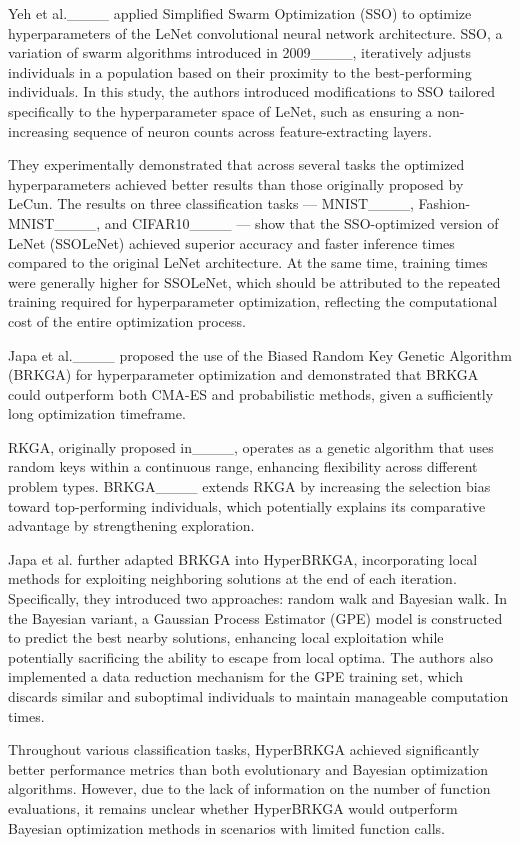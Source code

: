 Yeh et al.____ applied Simplified Swarm Optimization (SSO) to optimize hyperparameters of the LeNet convolutional neural network architecture.
SSO, a variation of swarm algorithms introduced in 2009____, iteratively adjusts individuals in a population based on their proximity to the best-performing individuals. In this study, the authors introduced modifications to SSO tailored specifically to the hyperparameter space of LeNet, such as ensuring a non-increasing sequence of neuron counts across feature-extracting layers.

They experimentally demonstrated that across several tasks the optimized hyperparameters achieved better results than those originally proposed by LeCun.
The results on three classification tasks — MNIST____, Fashion-MNIST____, and CIFAR10____ — show that the SSO-optimized version of LeNet (SSOLeNet) achieved superior accuracy and faster inference times compared to the original LeNet architecture. At the same time, training times were generally higher for SSOLeNet, which should be attributed to the repeated training required for hyperparameter optimization, reflecting the computational cost of the entire optimization process.

Japa et al.____ proposed the use of the Biased Random Key Genetic Algorithm (BRKGA) for hyperparameter optimization and demonstrated that BRKGA could outperform both CMA-ES and probabilistic methods, given a sufficiently long optimization timeframe.

RKGA, originally proposed in____, operates as a genetic algorithm that uses random keys within a continuous range, enhancing flexibility across different problem types. BRKGA____ extends RKGA by increasing the selection bias toward top-performing individuals, which potentially explains its comparative advantage by strengthening exploration.

Japa et al. further adapted BRKGA into HyperBRKGA, incorporating local methods for exploiting neighboring solutions at the end of each iteration. Specifically, they introduced two approaches: random walk and Bayesian walk. In the Bayesian variant, a Gaussian Process Estimator (GPE) model is constructed to predict the best nearby solutions, enhancing local exploitation while potentially sacrificing the ability to escape from local optima. The authors also implemented a data reduction mechanism for the GPE training set, which discards similar and suboptimal individuals to maintain manageable computation times.

Throughout various classification tasks, HyperBRKGA achieved significantly better performance metrics than both evolutionary and Bayesian optimization algorithms. However, due to the lack of information on the number of function evaluations, it remains unclear whether HyperBRKGA would outperform Bayesian optimization methods in scenarios with limited function calls.

